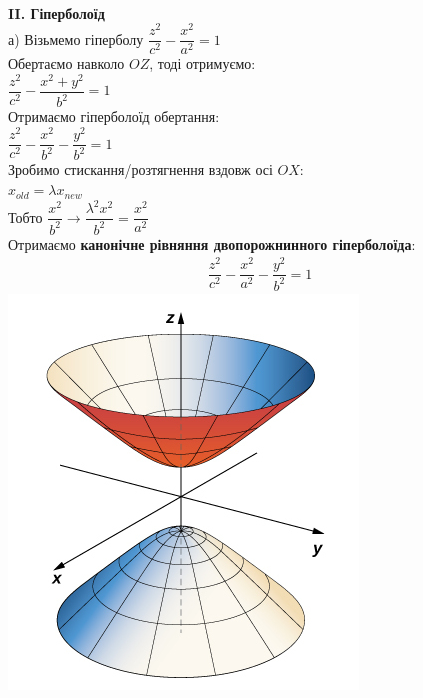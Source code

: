 \documentclass[a4paper, 14pt]{extarticle}
\def\bigline{\vspace{5mm}\\}
\begin{document}
%
\bigline

\textbf{II. Гіперболоїд}\\
а) Візьмемо гіперболу $\dfrac{z^2}{c^2} - \dfrac{x^2}{a^2} = 1$\\
Обертаємо навколо $OZ$, тоді отримуємо:\\
$\dfrac{z^2}{c^2} - \dfrac{x^2+y^2}{b^2} = 1$\\
Отримаємо гіперболоїд обертання:\\
$\dfrac{z^2}{c^2} - \dfrac{x^2}{b^2} - \dfrac{y^2}{b^2} = 1$\\
Зробимо стискання/розтягнення вздовж осі $OX$:\\
$x_{old} = \lambda x_{new}$\\
Тобто $\dfrac{x^2}{b^2} \to \dfrac{\lambda^2 x^2}{b^2} = \dfrac{x^2}{a^2}$\\
Отримаємо \textbf{канонічне рівняння двопорожнинного гіперболоїда}:
\begin{align*}
\dfrac{z^2}{c^2} - \dfrac{x^2}{a^2} - \dfrac{y^2}{b^2} = 1
\end{align*}
\includegraphics[scale=1]{2-shit-hyperboloid.jpeg}
\bigline
\end{document}

